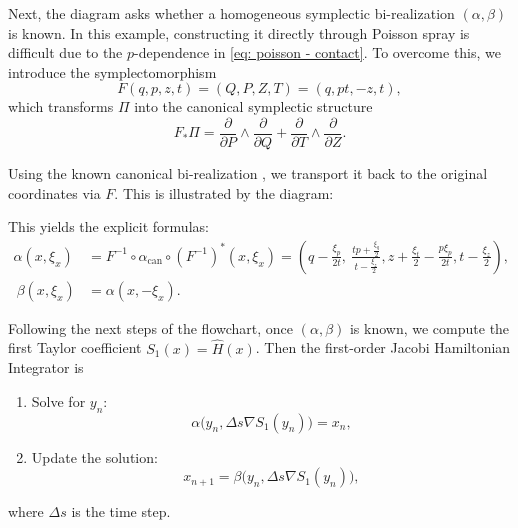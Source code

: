 \documentclass[12pt,english]{article}
\begin{document}
Next, the diagram asks whether a homogeneous symplectic bi-realization $(\alpha,\beta)$ is known. In this example, constructing it directly through Poisson spray is difficult due to the $p$-dependence in \eqref{eq: poisson - contact}. To overcome this, we introduce the symplectomorphism
\[
F(q,p,z,t) = (Q,P,Z,T) = (q, pt, -z, t),
\]
which transforms $\Pi$ into the canonical symplectic structure
\[
F_*\Pi = \frac{\partial}{\partial P}\wedge \frac{\partial}{\partial Q} + \frac{\partial}{\partial T}\wedge \frac{\partial}{\partial Z}.
\]

Using the known canonical bi-realization \cite{cosserat2023numerical}, we transport it back to the original coordinates via $F$. This is illustrated by the diagram:
\begin{center}
\end{center}

This yields the explicit formulas:
\begin{equation}\label{eq: alpha contact}
\begin{aligned}
\alpha(x,\xi_x) &= F^{-1}\circ \alpha_\mathrm{can} \circ (F^{-1})^* (x,\xi_x) 
= \left(q-\frac{\xi_p}{2t},\ \frac{tp+\frac{\xi_q}{2}}{t-\frac{\xi_z}{2}}, z+\frac{\xi_t}{2} - \frac{p\xi_p}{2t}, t-\frac{\xi_z}{2}\right), \\
  \ \beta(x,\xi_x) &= \alpha(x,-\xi_x).
\end{aligned}
\end{equation}

Following the next steps of the flowchart, once $(\alpha,\beta)$ is known, we compute the first Taylor coefficient $S_1(x) = \hat{H}(x)$. Then the first-order Jacobi Hamiltonian Integrator is
\begin{enumerate}
    \item Solve for $y_n$:
    \[
        \alpha\big(y_n, \Delta s \nabla S_1(y_n)\big) = x_n,
    \]
    \item Update the solution:
    \[
        x_{n+1} = \beta\big(y_n, \Delta s \nabla S_1(y_n)\big),
    \]
\end{enumerate}
where $\Delta s$ is the time step.
\end{document}
